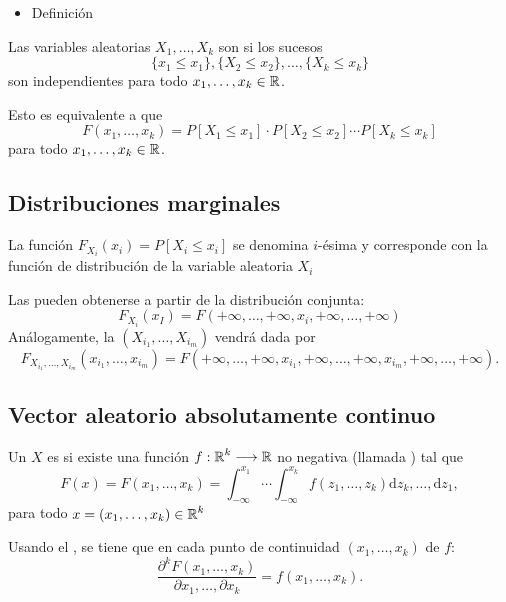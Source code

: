\begin{itemize}[label=\color{red}\textbullet, leftmargin=*]
	\item \color{lightblue}Definición
\end{itemize}
Las variables aleatorias $X_1,\dots,X_k$ son  si los sucesos \[ \{x_1\le x_1\},\{X_2\le x_2\},\dots,\{X_k\le x_k\} \]son independientes para todo $x_1,\dots,x_k\in\operatorname{\mathbb{R}}$.

Esto es equivalente a que \[ F(x_1,\dots,x_k)=P[X_1\le x_1]\cdot P[X_2\le x_2]\cdots P[X_k\le x_k] \]para todo $x_1,\dots,x_k\in\operatorname{\mathbb{R}}$.


\subsection{Distribuciones marginales}

La función $F_{X_i}(x_i)=P[X_i\le x_i]$ se denomina  $i$-ésima y corresponde con la función de distribución de la variable aleatoria $X_i$

Las  pueden obtenerse a partir de la distribución conjunta: \[ F_{X_i}(x_I)=F(+\infty,\dots,+\infty,x_i,+\infty,\dots,+\infty) \]
Análogamente, la  $(X_{i_1},\dots,X_{i_m})$ vendrá dada por \[ F_{X_{i_1},\dots,X_{i_m}}(x_{i_1},\dots,x_{i_m})=F(+\infty,\dots,+\infty,x_{i_1},+\infty,\dots,+\infty,x_{i_m},+\infty,\dots,+\infty). \]

\subsection{Vector aleatorio absolutamente continuo}

Un \vea $X$ es  si existe una función $f:\operatorname{\mathbb{R}}^k\longrightarrow\operatorname{\mathbb{R}}$ no negativa (llamada ) tal que \[ F(x)=F(x_1,\dots,x_k)=\int_{-\infty}^{x_1}\cdots\int_{-\infty}^{x_k}f(z_1,\dots,z_k)\mathrm{d}z_k,\dots,\mathrm{d}z_1, \]para todo $x=(x_1,\dots,x_k)\in\operatorname{\mathbb{R}}^k$

Usando el , se tiene que en cada punto de continuidad $(x_1,\dots,x_k)$ de $f$: \[ \dfrac{\partial^kF(x_1,\dots,x_k)}{\partial x_1,\dots,\partial x_k}=f(x_1,\dots,x_k).\]

